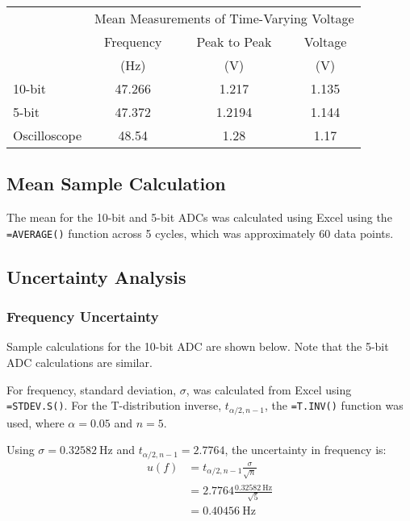 \begin{table}[h]
    \centering
    \label{tab:time-varying-voltage-mean-measurements}
    \begin{tabular}{lccc}
           & \multicolumn{3}{c}{Mean Measurements of Time-Varying Voltage} \\
    \cmidrule{2-4}
           & Frequency & Peak to Peak & Voltage       \\
           & (Hz)      & (V)          & (V)           \\
    \midrule
    10-bit & 47.266  & 1.217        & 1.135         \\
    5-bit  & 47.372  & 1.2194       & 1.144         \\
    Oscilloscope & 48.54 & 1.28 & 1.17 \\
   \bottomrule
    \end{tabular}
\end{table}
\subsection{Mean Sample Calculation}
The mean for the 10-bit and 5-bit ADCs was calculated using Excel using the \texttt{=AVERAGE()} function across 5 cycles, which was
approximately 60 data points. 

\subsection{Uncertainty Analysis}
\subsubsection{Frequency Uncertainty}
\noindent Sample calculations for the 10-bit ADC are shown below. Note that the 5-bit ADC calculations are similar.

For frequency, standard deviation, $\sigma$, was calculated from Excel using \texttt{=STDEV.S()}.
For the T-distribution inverse, $t_{\alpha/2, n-1}$, the \texttt{=T.INV()} function was used, where
$\alpha = 0.05$ and $n = 5$.

\noindent Using $\sigma = \qty{0.32582}{\hertz}$ and $t_{\alpha/2, n-1} = 2.7764$, the uncertainty in frequency is:
\[
\begin{aligned}
      u(f) &= t_{\alpha/2, n-1} \frac{\sigma}{\sqrt{n}} \\
            &= 2.7764 \frac{\qty{0.32582}{\hertz}}{\sqrt{5}} \\
            &= \qty{0.40456}{\hertz}
\end{aligned}   
\]

